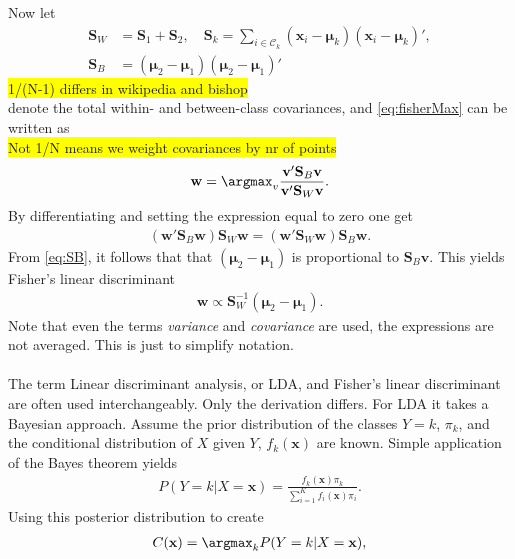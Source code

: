 Now let 
\begin{align}
  \mathbf{S}_W &= \mathbf{S}_1 + \mathbf{S}_2, \quad  \mathbf{S}_k =  \sum_{i \in \mathcal{C}_k} (\mathbf{x}_i - \bm{\mu}_k)(\mathbf{x}_i - \bm{\mu}_k)', \\
  \label{eq:SB} 
  \mathbf{S}_B &= (\bm{\mu}_2 - \bm{\mu}_1)(\bm{\mu}_2 - \bm{\mu}_1)'
\end{align}
\colorbox{yellow}{1/(N-1) differs in wikipedia and bishop}\\
denote the total within- and between-class covariances, and \eqref{eq:fisherMax} can be written as
\\ \colorbox{yellow}{Not 1/N means we weight covariances by nr of points}\\
\begin{align}
  \mathbf{w} = \argmax_v  \frac{\mathbf{v}'\mathbf{S}_B \mathbf{v}}{\mathbf{v}' \mathbf{S}_W \mathbf{v}}.
\end{align}
By differentiating and setting the expression equal to zero one get
\begin{align}
  (\mathbf{w}' \mathbf{S}_B \mathbf{w})\mathbf{S}_W \mathbf{w} = (\mathbf{w}' \mathbf{S}_W \mathbf{w})\mathbf{S}_B \mathbf{w}.
\end{align}
From \eqref{eq:SB}, it follows that that $(\bm{\mu}_2 - \bm{\mu}_1)$ is proportional to $\mathbf{S}_B \mathbf{v}$. This yields Fisher's linear discriminant
\begin{align}
  \mathbf{w} \propto \mathbf{S}_W^{-1} (\bm \mu_2 - \bm \mu_1).
\end{align}
Note that even the terms \textit{variance} and \textit{covariance} are used, the expressions are not averaged. This is just to simplify notation. \\
\\
The term Linear discriminant analysis, or LDA, and Fisher's linear discriminant are often used interchangeably. Only the derivation differs. For LDA it takes a Bayesian approach. Assume the prior distribution of the classes $Y=k$, $\pi_k$, and the conditional distribution of $X$ given $Y$, $f_k(\mathbf{x})$ are known. Simple application of the Bayes theorem yields 
\begin{align}
  P(Y=k|X=\mathbf{x}) = \frac{f_k(\mathbf{x}) \pi_k}{\sum^{K}_{i=1} f_i(\mathbf{x})\pi_i} .
\end{align}
Using this posterior distribution to create
\begin{align}
  \label{eq:bayesian} 
  C(\mathbf{x}) = \argmax_k P(Y=k|X=\mathbf{x}),
\end{align}
